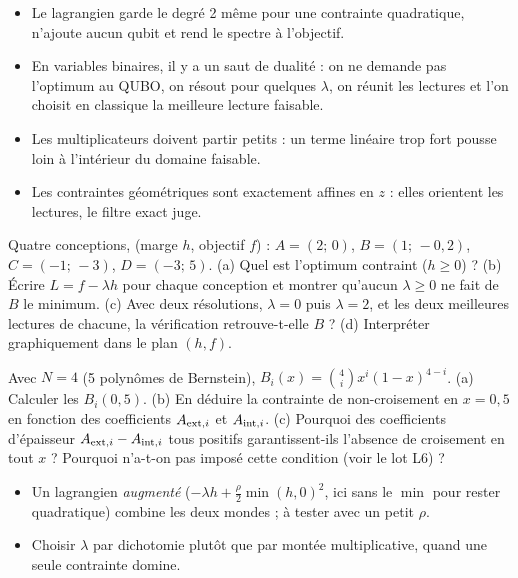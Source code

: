 \begin{resultat}
\begin{itemize}
\item Le lagrangien garde le degré 2 même pour une contrainte quadratique, n'ajoute aucun qubit et rend le spectre à l'objectif.
\item En variables binaires, il y a un saut de dualité : on ne demande pas l'optimum au QUBO, on résout pour quelques $\lambda$, on réunit les lectures et l'on choisit en classique la meilleure lecture faisable.
\item Les multiplicateurs doivent partir petits : un terme linéaire trop fort pousse loin à l'intérieur du domaine faisable.
\item Les contraintes géométriques sont exactement affines en $z$ : elles orientent les lectures, le filtre exact juge.
\end{itemize}
\end{resultat}

\exercices
\begin{exercice}\label{ex:lag-saut}
Quatre conceptions, (marge $h$, objectif $f$) : $A=(2;\,0)$, $B=(1;\,-0{,}2)$, $C=(-1;\,-3)$, $D=(-3;\,5)$. (a) Quel est l'optimum contraint ($h\ge0$) ? (b) Écrire $L=f-\lambda h$ pour chaque conception et montrer qu'aucun $\lambda\ge0$ ne fait de $B$ le minimum. (c) Avec deux résolutions, $\lambda=0$ puis $\lambda=2$, et les deux meilleures lectures de chacune, la vérification retrouve-t-elle $B$ ? (d) Interpréter graphiquement dans le plan $(h,f)$.
\end{exercice}
\begin{exercice}\label{ex:lag-geo}
Avec $N=4$ (5 polynômes de Bernstein), $B_i(x)=\binom4i x^i(1-x)^{4-i}$. (a) Calculer les $B_i(0{,}5)$. (b) En déduire la contrainte de non-croisement en $x=0{,}5$ en fonction des coefficients $A_{{\rm ext},i}$ et $A_{{\rm int},i}$. (c) Pourquoi des coefficients d'épaisseur $A_{{\rm ext},i}-A_{{\rm int},i}$ tous positifs garantissent-ils l'absence de croisement en tout $x$ ? Pourquoi n'a-t-on pas imposé cette condition (voir le lot L6) ?
\end{exercice}

\begin{pistes}
\begin{itemize}
\item Un lagrangien \emph{augmenté} ($-\lambda h+\tfrac\rho2\min(h,0)^2$, ici sans le $\min$ pour rester quadratique) combine les deux mondes ; à tester avec un petit $\rho$.
\item Choisir $\lambda$ par dichotomie plutôt que par montée multiplicative, quand une seule contrainte domine.
\end{itemize}
\end{pistes}
